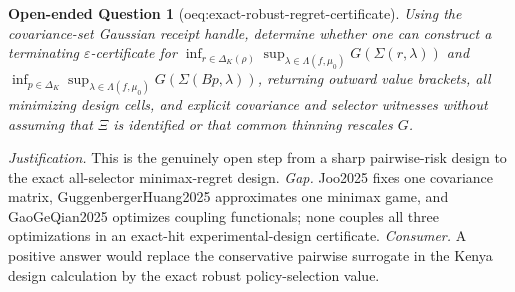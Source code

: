 \documentclass{article}
\newtheorem{openendedquestion}{Open-ended Question}
\begin{document}
\begin{openendedquestion}[oeq:exact-robust-regret-certificate]\label{oeq:exact-robust-regret-certificate}
Using the covariance-set Gaussian receipt handle, determine whether one can construct a terminating \(\varepsilon\)-certificate for \(\inf_{r\in\Delta_K(\rho)}\sup_{\lambda\in\Lambda(f,\mu_0)}G(\Sigma(r,\lambda))\) and \(\inf_{p\in\Delta_K}\sup_{\lambda\in\Lambda(f,\mu_0)}G(\Sigma(Bp,\lambda))\), returning outward value brackets, all minimizing design cells, and explicit covariance and selector witnesses without assuming that \(\Xi\) is identified or that common thinning rescales \(G\).
\end{openendedquestion}
\par\smallskip\noindent \textit{Justification.} This is the genuinely open step from a sharp pairwise-risk design to the exact all-selector minimax-regret design. \textit{Gap.} Joo2025 fixes one covariance matrix, GuggenbergerHuang2025 approximates one minimax game, and GaoGeQian2025 optimizes coupling functionals; none couples all three optimizations in an exact-hit experimental-design certificate. \textit{Consumer.} A positive answer would replace the conservative pairwise surrogate in the Kenya design calculation by the exact robust policy-selection value.
\end{document}
